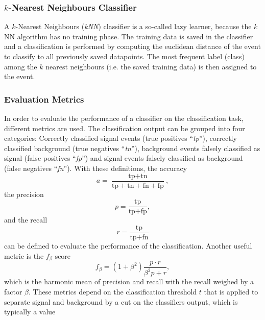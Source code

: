 \subsubsection{$k$-Nearest Neighbours Classifier}
\label{subsec:kNN}
A $k$-Nearest Neighbours (\textit{kNN}) classifier is a so-called lazy learner, because the $k$NN algorithm has no training phase.
The training data is saved in the classifier and a classification is performed by computing the euclidean distance of the event to classify to 
all previously saved datapoints. The most frequent label (class) among the $k$ nearest neighbours (i.e. the saved training data) is then 
assigned to the event.

\subsubsection{Evaluation Metrics}
\label{subsec:Evaluation}
In order to evaluate the performance of a classifier on the classification task, different metrics are used.
The classification output can be grouped into four categories: Correctly classified signal events (true positives \enquote{\textit{tp}}), correctly classified background 
(true negatives \enquote{\textit{tn}}), background events falsely classified as signal (false positives \enquote{\textit{fp}}) and signal events falsely classified as background
(false negatives \enquote{\textit{fn}}). With these definitions, the accuracy 
\begin{equation}
    a = \frac{\text{tp} + \text{tn}}{\text{tp} + \text{tn} + \text{fn} + \text{fp}},
    \label{eq:accuracy}
\end{equation}
the precision
\begin{equation}
    p = \frac{\text{tp} }{\text{tp} + \text{fp}},
    \label{eq:precision}
\end{equation}
and the recall 
\begin{equation}
    r = \frac{\text{tp} }{\text{tp} + \text{fn}}
    \label{eq:recall}
\end{equation}
can be defined to evaluate the performance of the classification.
Another useful metric is the $f_\beta$ score
\begin{equation}
    f_\beta = (1 + \beta^2)\frac{p \cdot r}{\beta^2 p + r},
    \label{eq:f_beta}
\end{equation}
which is the harmonic mean of precision and recall with the recall weighed by a factor $\beta$.
These metrics depend on the classification threshold $t$ that is applied to separate signal and background by a cut on the classifiers output, which is typically a value 
